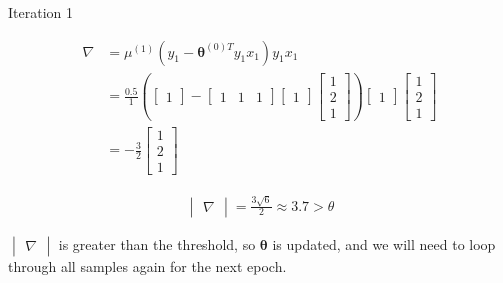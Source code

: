 \documentclass[a4paper, 10pt, twoside]{article}
\begin{document}
\begin{enumerate}[a)]
          Iteration 1

          \begin{align*}
              \nabla
               & =
              \mu^{(1)}(y_1-\bm{\theta}^{(0)T}y_1x_1)y_1x_1 \\
               & =
              \frac{0.5}{1}
              \left(
              \begin{bmatrix}
                      1
                  \end{bmatrix}
              -
              \begin{bmatrix}
                      1 & 1 & 1
                  \end{bmatrix}
              \begin{bmatrix}
                      1
                  \end{bmatrix}
              \begin{bmatrix}
                      1 \\ 2 \\ 1
                  \end{bmatrix}
              \right)
              \begin{bmatrix}
                  1
              \end{bmatrix}
              \begin{bmatrix}
                  1 \\ 2 \\ 1
              \end{bmatrix}                    \\
               & =
              -\frac{3}{2}
              \begin{bmatrix}
                  1 \\ 2 \\ 1
              \end{bmatrix}
          \end{align*}

          \begin{align*}
              \begin{vmatrix}
                  \nabla
              \end{vmatrix} = \frac{3\sqrt{6}}{2} \approx 3.7 > \theta
          \end{align*}

          $\begin{vmatrix} \nabla \end{vmatrix}$ is greater than the threshold, so $ \bm{\theta} $ is updated, and we will need to loop through all samples again for the next epoch.


\end{enumerate}
\end{document}
